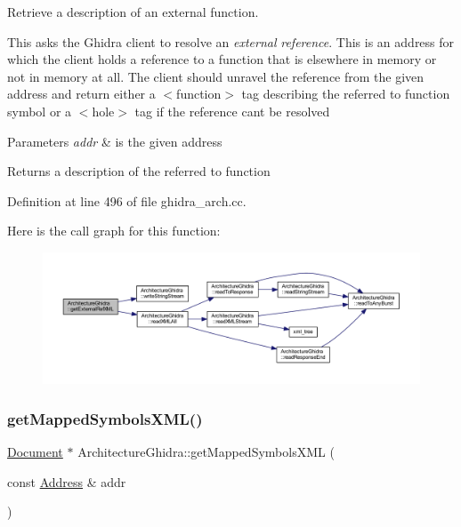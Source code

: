 Retrieve a description of an external function. 

This asks the Ghidra client to resolve an {\itshape external} {\itshape reference}. This is an address for which the client holds a reference to a function that is elsewhere in memory or not in memory at all. The client should unravel the reference from the given address and return either a $<$function$>$ tag describing the referred to function symbol or a $<$hole$>$ tag if the reference can\textquotesingle{}t be resolved 
\begin{DoxyParams}{Parameters}
{\em addr} & is the given address \\
\hline
\end{DoxyParams}
\begin{DoxyReturn}{Returns}
a description of the referred to function 
\end{DoxyReturn}


Definition at line 496 of file ghidra\+\_\+arch.\+cc.

Here is the call graph for this function\+:
\nopagebreak
\begin{figure}[H]
\begin{center}
\leavevmode
\includegraphics[width=350pt]{class_architecture_ghidra_ab3f7d8642e6d84aa7ee3806620ef34ff_cgraph}
\end{center}
\end{figure}
\mbox{\label{class_architecture_ghidra_a03d6804fba40e0c09e6be5e3ad5f8723}} 
\subsubsection{\texorpdfstring{getMappedSymbolsXML()}{getMappedSymbolsXML()}}
{\footnotesize\ttfamily \mbox{\hyperlink{class_document}{Document}} $\ast$ Architecture\+Ghidra\+::get\+Mapped\+Symbols\+X\+ML (\begin{DoxyParamCaption}\item[{const \mbox{\hyperlink{class_address}{Address}} \&}]{addr }\end{DoxyParamCaption})}



